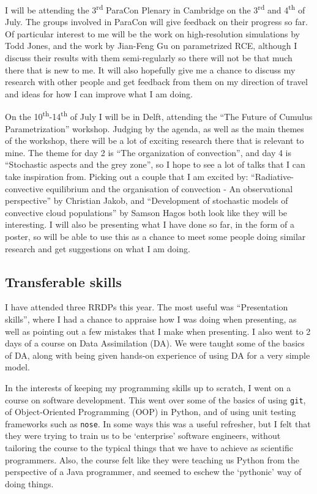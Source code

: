 \documentclass[11pt,a4paper]{article}
\newcommand{\ts}{\textsuperscript}
\begin{document}
I will be attending the 3\ts{rd} ParaCon Plenary in Cambridge on the 3\ts{rd} and 4\ts{th} of July. The groups involved in ParaCon will give feedback on their progress so far. Of particular interest to me will be the work on high-resolution simulations by Todd Jones, and the work by Jian-Feng Gu on parametrized RCE, although I discuss their results with them semi-regularly so there will not be that much there that is new to me. It will also hopefully give me a chance to discuss my research with other people and get feedback from them on my direction of travel and ideas for how I can improve what I am doing.

On the 10\ts{th}-14\ts{th} of July I will be in Delft, attending the ``The Future of Cumulus Parametrization'' workshop. Judging by the agenda, as well as the main themes of the workshop, there will be a lot of exciting research there that is relevant to mine. The theme for day 2 is ``The organization of convection'', and day 4 is ``Stochastic aspects and the grey zone'', so I hope to see a lot of talks that I can take inspiration from. Picking out a couple that I am excited by: ``Radiative-convective equilibrium and the organisation of convection - An observational perspective'' by Christian Jakob, and ``Development of stochastic models of convective cloud populations'' by Samson Hagos both look like they will be interesting. I will also be presenting what I have done so far, in the form of a poster, so will be able to use this as a chance to meet some people doing similar research and get suggestions on what I am doing.

\subsection{Transferable skills}

I have attended three RRDPs this year. The most useful was ``Presentation skills'', where I had a chance to appraise how I was doing when presenting, as well as pointing out a few mistakes that I make when presenting. I also went to 2 days of a course on Data Assimilation (DA). We were taught some of the basics of DA, along with being given hands-on experience of using DA for a very simple model.

In the interests of keeping my programming skills up to scratch, I went on a course on software development. This went over some of the basics of using \texttt{git}, of Object-Oriented Programming (OOP) in Python, and of using unit testing frameworks such as \texttt{nose}. In some ways this was a useful refresher, but I felt that they were trying to train us to be `enterprise' software engineers, without tailoring the course to the typical things that we have to achieve as scientific programmers. Also, the course felt like they were teaching us Python from the perspective of a Java programmer, and seemed to eschew the `pythonic' way of doing things.
\end{document}
